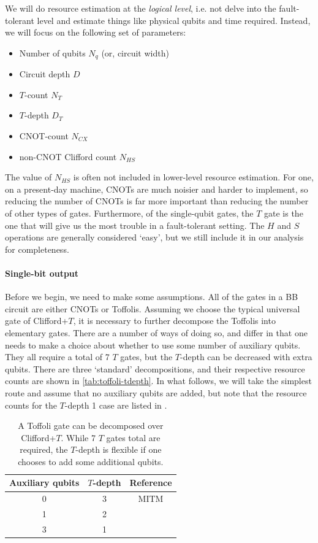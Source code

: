 \documentclass[a4paper,12pt]{article}
\begin{document}
We will do resource estimation at the \emph{logical level}, i.e. not delve into the fault-tolerant level and estimate things like physical qubits and time required. Instead, we will focus on the following set of parameters:
\begin{itemize}
 \item Number of qubits $N_q$ (or, circuit width)
 \item Circuit depth $D$
 \item $T$-count $N_T$
 \item $T$-depth $D_T$
 \item CNOT-count $N_{CX}$
 \item non-CNOT Clifford count $N_{HS}$
\end{itemize}
The value of $N_{HS}$ is often not included in lower-level resource estimation. For one, on a present-day machine, CNOTs are much noisier and harder to implement, so reducing the number of CNOTs is far more important than reducing the number of other types of gates. Furthermore, of the single-qubit gates, the $T$ gate is the one that will give us the most trouble in a fault-tolerant setting. The $H$ and $S$ operations are generally considered `easy', but we still include it in our analysis for completeness.

\paragraph{Single-bit output}

Before we begin, we need to make some assumptions. All of the gates in a BB circuit are either CNOTs or Toffolis. Assuming we choose the typical universal gate of Clifford+$T$, it is necessary to further decompose the Toffolis into elementary gates. There are a number of ways of doing so, and differ in that one needs to make a choice about whether to use some number of auxiliary qubits. They all require a total of 7 $T$ gates, but the $T$-depth can be decreased with extra qubits. There are three `standard' decompositions, and their respective resource counts are shown in \autoref{tab:toffoli-tdepth}. 
In what follows, we will take the simplest route and assume that no auxiliary qubits are added, but note that the resource counts for the $T$-depth 1 case are listed in \cite{DiMatteo2020}. 

\begin{table}
 \centering
  \captionsetup{width=.89\linewidth}
 \begin{tabular}{|c|c|c|}
  \hline
  Auxiliary qubits & $T$-depth & Reference \\ \hline
  0 & 3 & MITM \\ \hline
  1 & 2 & \\ \hline
  3 & 1 & \cite{Selinger2013} \\ \hline
 \end{tabular}
 \caption{A Toffoli gate can be decomposed over Clifford+$T$. While 7 $T$ gates total are required, the $T$-depth is flexible if one chooses to add some additional qubits. }
 \label{tab:toffoli-tdepth}
\end{table}
\end{document}
